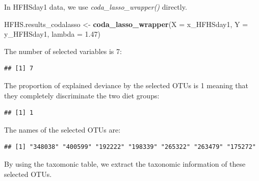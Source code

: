 \documentclass[openany]{book}
\newenvironment{Shaded}{\begin{snugshade}}{\end{snugshade}}
\newcommand{\KeywordTok}[1]{\textcolor[rgb]{0.13,0.29,0.53}{\textbf{#1}}}
\newcommand{\DataTypeTok}[1]{\textcolor[rgb]{0.13,0.29,0.53}{#1}}
\newcommand{\FloatTok}[1]{\textcolor[rgb]{0.00,0.00,0.81}{#1}}
\newcommand{\StringTok}[1]{\textcolor[rgb]{0.31,0.60,0.02}{#1}}
\newcommand{\OperatorTok}[1]{\textcolor[rgb]{0.81,0.36,0.00}{\textbf{#1}}}
\newcommand{\NormalTok}[1]{#1}
\begin{document}
In HFHSday1 data, we use \emph{coda\_lasso\_wrapper()} directly.

\begin{Shaded}
\begin{Highlighting}[]
\NormalTok{HFHS.results_codalasso <-}\StringTok{ }\KeywordTok{coda_lasso_wrapper}\NormalTok{(}\DataTypeTok{X =}\NormalTok{ x_HFHSday1, }\DataTypeTok{Y =}\NormalTok{ y_HFHSday1, }\DataTypeTok{lambda =} \FloatTok{1.47}\NormalTok{) }
\end{Highlighting}
\end{Shaded}

The number of selected variables is 7:

\begin{Shaded}
\end{Shaded}

\begin{verbatim}
## [1] 7
\end{verbatim}

The proportion of explained deviance by the selected OTUs is 1 meaning
that they completely discriminate the two diet groups:

\begin{Shaded}
\end{Shaded}

\begin{verbatim}
## [1] 1
\end{verbatim}

The names of the selected OTUs are:

\begin{Shaded}
\end{Shaded}

\begin{verbatim}
## [1] "348038" "400599" "192222" "198339" "265322" "263479" "175272"
\end{verbatim}

By using the taxomonic table, we extract the taxonomic information of
these selected OTUs.
\end{document}

